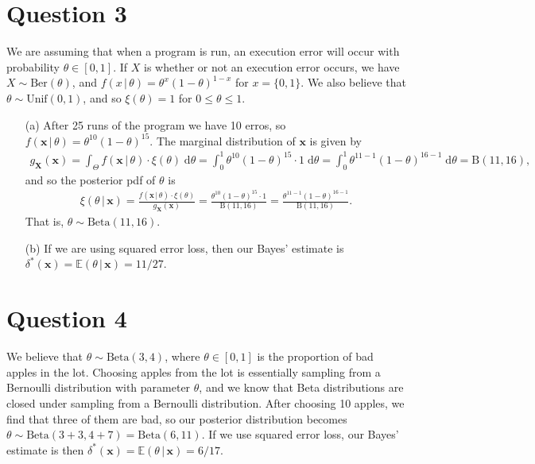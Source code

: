 \documentclass[10pt]{article}
\begin{document}
\section{Question 3} \noindent
We are assuming that when a program is run, an execution error will occur with probability \(\theta \in [0,1]\). If \(X\) is whether or not an execution error
occurs, we have \(X \sim \mathrm{Ber}(\theta)\), and \(f(x \,|\, \theta) = \theta^x (1 - \theta)^{1 - x}\) for \(x = \{0,1\}\). We also believe that 
\(\theta \sim \mathrm{Unif}(0,1)\), and so \(\xi(\theta) = 1\) for \(0 \le \theta \le 1\).
\begin{itemize}
    \item[(a)] After 25 runs of the program we have 10 erros, so \(f(\mathbf{x} \,|\, \theta) = \theta^{10}(1 - \theta)^{15}\). The marginal distribution of 
    \(\mathbf{x}\) is given by 
    \begin{align*}
        g_{\bm{X}}(\mathbf{x})
        = \int_{\Theta} f(\mathbf{x} \,|\, \theta) \cdot \xi(\theta) \;\mathrm{d}\theta 
        = \int_0^1 \theta^{10} (1 - \theta)^{15} \cdot 1 \;\mathrm{d}\theta
        = \int_0^1 \theta^{11 - 1} (1 - \theta)^{16 - 1} \;\mathrm{d}\theta
        = \mathrm{B}(11, 16),
    \end{align*}
    and so the posterior pdf of \(\theta\) is 
    \begin{align*}
        \xi(\theta \,|\, \mathbf{x})
        = \frac{f(\mathbf{x} \,|\, \theta) \cdot \xi(\theta)}{g_{\bm{X}}(\mathbf{x})}
        = \frac{\theta^{10} (1 - \theta)^{15} \cdot 1}{\mathrm{B}(11, 16)}
        = \frac{\theta^{11 - 1} (1 - \theta)^{16 - 1}}{\mathrm{B}(11, 16)}.
    \end{align*}
    That is, \(\theta \sim \mathrm{Beta}(11, 16)\). 
    \item[(b)] If we are using squared error loss, then our Bayes' estimate is 
    \(\delta^*(\mathbf{x}) = \mathbb{E}(\theta \,|\, \mathbf{x}) = 11/27\).
\end{itemize}

\section{Question 4} \noindent
We believe that \(\theta \sim \mathrm{Beta}(3, 4)\), where \(\theta \in [0,1]\) is the proportion of bad apples in the lot. 
Choosing apples from the lot is essentially sampling from a Bernoulli distribution with parameter \(\theta\),
and we know that Beta distributions are closed under sampling from a Bernoulli distribution. After choosing 
10 apples, we find that three of them are bad, so our posterior distribution becomes \(\theta \sim \mathrm{Beta}(3+3, 4+7) = \mathrm{Beta}(6,11)\).
If we use squared error loss, our Bayes' estimate is then \(\delta^*(\mathbf{x}) = \mathbb{E}(\theta \,|\, \mathbf{x}) = 6 / 17\).
\end{document}
